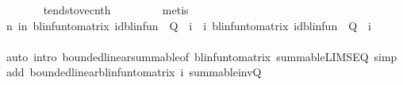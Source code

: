 \begin{isabellebody}
\ \ \ \ \ \ \isamarkupfalse%
\ tendsto{\isacharunderscore}{\kern0pt}vec{\isacharunderscore}{\kern0pt}nth\ \isanewline
\ \ \ \ \ \ \isamarkupfalse%
\ metis\isanewline
\ \ \ \ \isamarkupfalse%
\ {\isachardoublequoteopen}{\isacharparenleft}{\kern0pt}{\isasymlambda}n{\isachardot}{\kern0pt}\ {\isacharparenleft}{\kern0pt}{\isasymSum}i{\isacharless}{\kern0pt}n{\isachardot}{\kern0pt}\ blinfun{\isacharunderscore}{\kern0pt}to{\isacharunderscore}{\kern0pt}matrix\ {\isacharparenleft}{\kern0pt}{\isacharparenleft}{\kern0pt}id{\isacharunderscore}{\kern0pt}blinfun\ {\isacharminus}{\kern0pt}\ Q{}{\isacharparenright}{\kern0pt}\ {\isacharcircum}{\kern0pt}{\isacharcircum}{\kern0pt}\ i{\isacharparenright}{\kern0pt}{\isacharparenright}{\kern0pt}{\isacharparenright}{\kern0pt}\ {\isasymlonglonglongrightarrow}\ {\isacharparenleft}{\kern0pt}{\isasymSum}i{\isachardot}{\kern0pt}\ blinfun{\isacharunderscore}{\kern0pt}to{\isacharunderscore}{\kern0pt}matrix\ {\isacharparenleft}{\kern0pt}{\isacharparenleft}{\kern0pt}id{\isacharunderscore}{\kern0pt}blinfun\ {\isacharminus}{\kern0pt}\ Q{}{\isacharparenright}{\kern0pt}\ {\isacharcircum}{\kern0pt}{\isacharcircum}{\kern0pt}\ i{\isacharparenright}{\kern0pt}{\isacharparenright}{\kern0pt}{\isachardoublequoteclose}\isanewline
\ \ \ \ \ \ \isamarkupfalse%
\ {\isacharparenleft}{\kern0pt}auto\ intro{\isacharbang}{\kern0pt}{\isacharcolon}{\kern0pt}\ bounded{\isacharunderscore}{\kern0pt}linear{\isachardot}{\kern0pt}summable{\isacharbrackleft}{\kern0pt}of\ blinfun{\isacharunderscore}{\kern0pt}to{\isacharunderscore}{\kern0pt}matrix{\isacharbrackright}{\kern0pt}\ summable{\isacharunderscore}{\kern0pt}LIMSEQ\ simp\ add{\isacharcolon}{\kern0pt}\ bounded{\isacharunderscore}{\kern0pt}linear{\isacharunderscore}{\kern0pt}blinfun{\isacharunderscore}{\kern0pt}to{\isacharunderscore}{\kern0pt}matrix\ i{}{\isacharparenleft}{\kern0pt}{}{\isacharparenright}{\kern0pt}\ summable{\isacharunderscore}{\kern0pt}inv{\isacharunderscore}{\kern0pt}Q{\isacharparenright}{\kern0pt}\isanewline
\ \ \ \ \isamarkupfalse%

\end{isabellebody}
